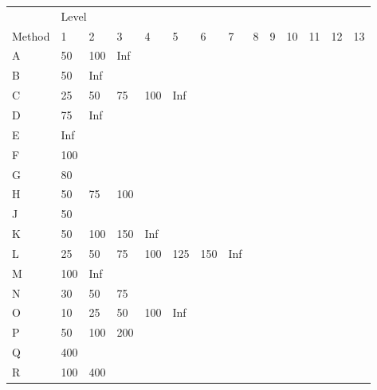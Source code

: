 \begin{table}[]
	\begin{tabular}{l|lllllllllllll}
		\hline
		& \multicolumn{12}{l}{Level}                                           &     \\
		\cline{2-14}
		Method & 1   & 2   & 3   & 4   & 5   & 6   & 7   & 8   & 9  & 10  & 11  & 12  & 13  \\
		\hline
		A      & 50  & 100 & Inf &     &     &     &     &     &    &     &     &     &     \\
		B      & 50  & Inf &     &     &     &     &     &     &    &     &     &     &     \\
		C      & 25  & 50  & 75  & 100 & Inf &     &     &     &    &     &     &     &     \\
		D      & 75  & Inf &     &     &     &     &     &     &    &     &     &     &     \\
		E      & Inf &     &     &     &     &     &     &     &    &     &     &     &     \\
		F      & 100 &     &     &     &     &     &     &     &    &     &     &     &     \\
		G      & 80  &     &     &     &     &     &     &     &    &     &     &     &     \\
		H      & 50  & 75  & 100 &     &     &     &     &     &    &     &     &     &     \\
		J      & 50  &     &     &     &     &     &     &     &    &     &     &     &     \\
		K      & 50  & 100 & 150 & Inf &     &     &     &     &    &     &     &     &     \\
		L      & 25  & 50  & 75  & 100 & 125 & 150 & Inf &     &    &     &     &     &     \\
		M      & 100 & Inf &     &     &     &     &     &     &    &     &     &     &     \\
		N      & 30  & 50  & 75  &     &     &     &     &     &    &     &     &     &     \\
		O      & 10  & 25  & 50  & 100 & Inf &     &     &     &    &     &     &     &     \\
		P      & 50  & 100 & 200 &     &     &     &     &     &    &     &     &     &     \\
		Q      & 400 &     &     &     &     &     &     &     &    &     &     &     &     \\
		R      & 100 & 400 &     &     &     &     &     &     &    &     &     &     &     \\

\end{tabular}
\end{table}
